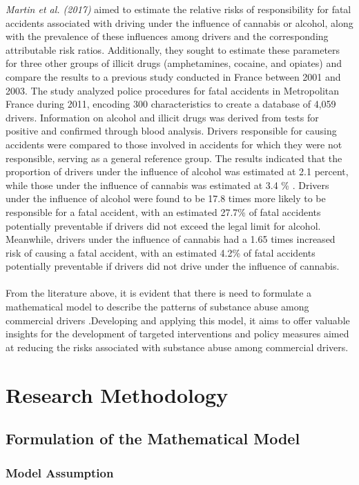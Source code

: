 \documentclass[12pt]{report}
\begin{document}
\textit{Martin et al. (2017)} aimed to estimate the relative risks of responsibility for fatal accidents associated with driving under the influence of cannabis or alcohol, along with the prevalence of these influences among drivers and the corresponding attributable risk ratios. Additionally, they sought to estimate these parameters for three other groups of illicit drugs (amphetamines, cocaine, and opiates) and compare the results to a previous study conducted in France between 2001 and 2003.
The study analyzed police procedures for fatal accidents in Metropolitan France during 2011, encoding 300 characteristics to create a database of 4,059 drivers. Information on alcohol and illicit drugs was derived from tests for positive and confirmed through blood analysis. Drivers responsible for causing accidents were compared to those involved in accidents for which they were not responsible, serving as a general reference group.
The results indicated that the proportion of drivers under the influence of alcohol was estimated at 2.1 percent,   while those under the influence of cannabis was estimated at 3.4 \% . Drivers under the influence of alcohol were found to be 17.8 times more likely to be responsible for a fatal accident, with an estimated 27.7\% of fatal accidents potentially preventable if drivers did not exceed the legal limit for alcohol. Meanwhile, drivers under the influence of cannabis had a 1.65 times increased risk of causing a fatal accident, with an estimated 4.2\% of fatal accidents potentially preventable if drivers did not drive under the influence of cannabis.\\\\

From  the literature above, it is evident that there is need to formulate a mathematical model to describe the patterns of substance abuse among commercial drivers .Developing and applying this model, it aims to offer valuable insights for the development of targeted interventions and policy measures aimed at reducing the risks associated with substance abuse among commercial drivers.
 
\newpage
\chapter{Research Methodology}
\section{Formulation of the Mathematical Model  }
\subsection{Model Assumption}
\end{document}
